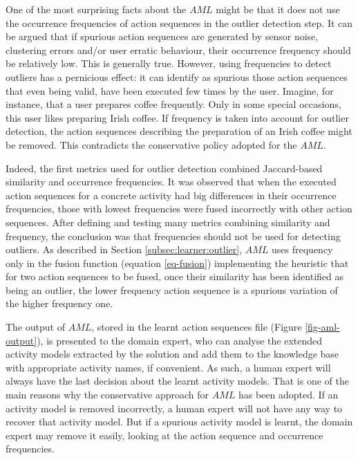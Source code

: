 One of the most surprising facts about the $AML$ might be that it does not use the occurrence frequencies of action sequences in the outlier detection step. It can be argued that if spurious action sequences are generated by sensor noise, clustering errors and/or user erratic behaviour, their occurrence frequency should be relatively low. This is generally true. However, using frequencies to detect outliers has a pernicious effect: it can identify as spurious those action sequences that even being valid, have been executed few times by the user. Imagine, for instance, that a user prepares coffee frequently. Only in some special occasions, this user likes preparing Irish coffee. If frequency is taken into account for outlier detection, the action sequences describing the preparation of an Irish coffee might be removed. This contradicts the conservative policy adopted for the $AML$.

Indeed, the first metrics used for outlier detection combined Jaccard-based similarity and occurrence frequencies. It was observed that when the executed action sequences for a concrete activity had big differences in their occurrence frequencies, those with lowest frequencies were fused incorrectly with other action sequences. After defining and testing many metrics combining similarity and frequency, the conclusion was that frequencies should not be used for detecting outliers. As described in Section \ref{subsec:learner:outlier}, $AML$ uses frequency only in the fusion function (equation \ref{eq-fusion}) implementing the heuristic that for two action sequences to be fused, once their similarity has been identified as being an outlier, the lower frequency action sequence is a spurious variation of the higher frequency one. 

The output of $AML$, stored in the learnt action sequences file (Figure \ref{fig-aml-output}), is presented to the domain expert, who can analyse the extended activity models extracted by the solution and add them to the knowledge base with appropriate activity names, if convenient. As such, a human expert will always have the last decision about the learnt activity models. That is one of the main reasons why the conservative approach for $AML$ has been adopted. If an activity model is removed incorrectly, a human expert will not have any way to recover that activity model. But if a spurious activity model is learnt, the domain expert may remove it easily, looking at the action sequence and occurrence frequencies.